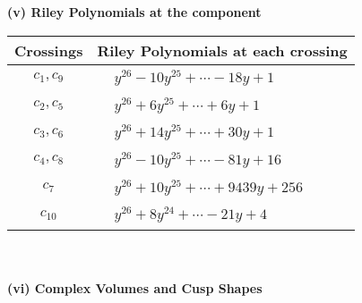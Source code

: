 \documentclass[1p]{elsarticle_modified}
\theoremstyle{definition}
\begin{document}
\newpage\renewcommand{\arraystretch}{1}
\flushleft \textbf{(v) Riley Polynomials at the component}\newline \\
\begin{tabular}{m{50pt}|m{274pt}}
Crossings & \hspace{64pt}Riley Polynomials at each crossing \\
\hline $$\begin{aligned}c_{1},c_{9}\end{aligned}$$&$\begin{aligned}
&y^{26}-10 y^{25}+\cdots-18 y+1
\end{aligned}$\\
\hline $$\begin{aligned}c_{2},c_{5}\end{aligned}$$&$\begin{aligned}
&y^{26}+6 y^{25}+\cdots+6 y+1
\end{aligned}$\\
\hline $$\begin{aligned}c_{3},c_{6}\end{aligned}$$&$\begin{aligned}
&y^{26}+14 y^{25}+\cdots+30 y+1
\end{aligned}$\\
\hline $$\begin{aligned}c_{4},c_{8}\end{aligned}$$&$\begin{aligned}
&y^{26}-10 y^{25}+\cdots-81 y+16
\end{aligned}$\\
\hline $$\begin{aligned}c_{7}\end{aligned}$$&$\begin{aligned}
&y^{26}+10 y^{25}+\cdots+9439 y+256
\end{aligned}$\\
\hline $$\begin{aligned}c_{10}\end{aligned}$$&$\begin{aligned}
&y^{26}+8 y^{24}+\cdots-21 y+4
\end{aligned}$\\
\hline
\end{tabular}\\~\\
\newpage\flushleft \textbf{(vi) Complex Volumes and Cusp Shapes}
\end{document}
